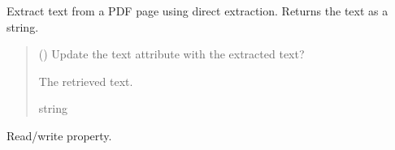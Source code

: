 \documentclass[letterpaper,10pt,english]{sphinxmanual}
\begin{document}
\begin{fulllineitems}
\begin{fulllineitems}
\begin{quote}
\begin{description}
\end{description}\end{quote}

\end{fulllineitems}


\begin{fulllineitems}
\label{\detokenize{generated/bp_text.pdf:bp_text.pdf.PdfPage.extract_text}}
\pysigstartsignatures
\pysiglinewithargsret
{}
{}
{}
\pysigstopsignatures
\sphinxAtStartPar
Extract text from a PDF page using direct extraction.
Returns the text as a string.
\begin{quote}\begin{description}
\sphinxAtStartPar
{} () \textendash{} Update the text attribute with the extracted text?

\sphinxAtStartPar
The retrieved text.

\sphinxAtStartPar
string

\end{description}\end{quote}

\end{fulllineitems}


\begin{fulllineitems}
\label{\detokenize{generated/bp_text.pdf:bp_text.pdf.PdfPage.file}}
\pysigstartsignatures
\pysigline
{}
\pysigstopsignatures
\sphinxAtStartPar
Read/write property.

\end{fulllineitems}


\begin{fulllineitems}
\label{\detokenize{generated/bp_text.pdf:bp_text.pdf.PdfPage.lang}}
\pysigstartsignatures
\pysigline
{}
\pysigstopsignatures
\end{fulllineitems}


\end{fulllineitems}
\end{document}
